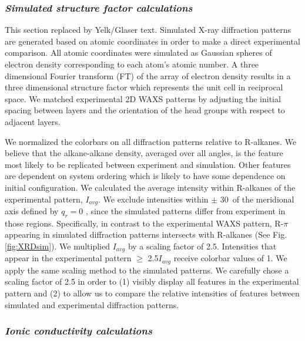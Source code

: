 \documentclass[journal=jpcbfk,manusciprt=article]{achemso}
\begin{document}
  \subsubsection{\textit{Simulated structure factor calculations}}
  {\color{red}This section replaced by Yelk/Glaser text}. 
  Simulated X-ray diffraction patterns are generated based on atomic
  coordinates in order to make a direct experimental comparison. All atomic
  coordinates were simulated as Gaussian spheres of electron density
  corresponding to each atom's atomic number. A three dimensional Fourier
  transform (FT) of the array of electron density results in a three dimensional
  structure factor which represents the unit cell in reciprocal space. We matched
  experimental 2D WAXS patterns by adjusting the initial spacing between layers
  and the orientation of the head groups with respect to adjacent layers.

  We normalized the colorbars on all diffraction patterns relative to
  R-alkanes. We believe that the alkane-alkane density, averaged over all angles,
  is the feature most likely to be replicated between experiment and simulation.
  Other features are dependent on system ordering which is likely to have some
  dependence on initial configuration. We calculated the average intensity within
  R-alkanes of the experimental pattern, $I_{avg}$. We exclude intensities
  within $\pm$ 30\degree~of the meridional axis defined by $q_r=0$ , since the simulated patterns differ
  from experiment in those regions. Specifically, in contrast to the
  experimental WAXS pattern, R-$\pi$ appearing in simulated diffraction patterns
  intersects with R-alkanes (See Fig. \ref{fig:XRDsim}). We multiplied $I_{avg}$
  by a scaling factor of 2.5. Intensities that appear in the experimental pattern
  $\geq$ 2.5$I_{avg}$ receive colorbar values of 1. We apply the same scaling
  method to the simulated patterns. We carefully chose a scaling factor of 2.5 in
  order to (1) visibly display all features in the experimental pattern and (2)
  to allow us to compare the relative intensities of features between simulated
  and experimental diffraction patterns.

  \subsubsection{\textit{Ionic conductivity calculations}}
\end{document}
